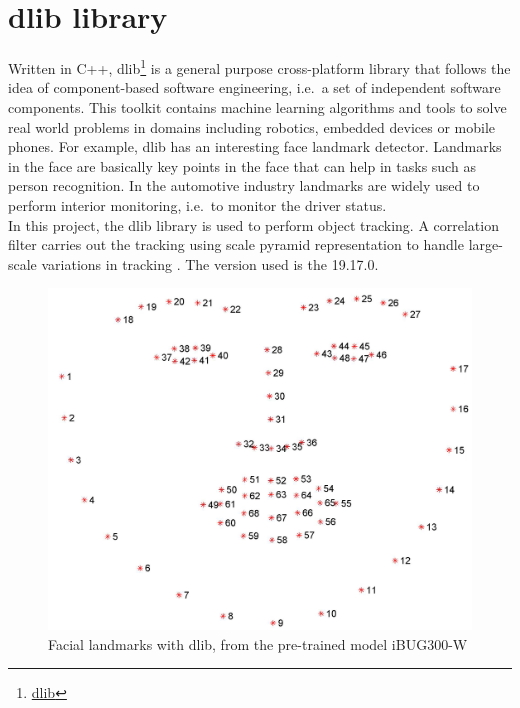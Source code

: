 \section{dlib library}
Written in C++, dlib\footnote {\href{http://dlib.net/}{dlib}} is a general purpose cross-platform library that follows the idea of component-based software engineering, i.e.\ a set of independent software components. This toolkit contains machine learning algorithms and tools to solve real world problems in domains including robotics, embedded devices or mobile phones. For example, dlib has an interesting face landmark detector. Landmarks in the face are basically key points in the face that can help in tasks such as person recognition. In the automotive industry landmarks are widely used to perform interior monitoring, i.e.\ to monitor the driver status.
\\In this project, the dlib library is used to perform object tracking. A correlation filter carries out the tracking using scale pyramid representation to handle large-scale variations in tracking \cite{danelljan2014accurate}. The version used is the 19.17.0.
\begin{figure}[H]
\begin{center}
\includegraphics[scale=0.15]{figures/dlib.jpg}
\caption{Facial landmarks with dlib, from the pre-trained model iBUG300-W \cite{sagonas2016300}}
\label{fig:pyqt}
\end{center}
\end{figure}

